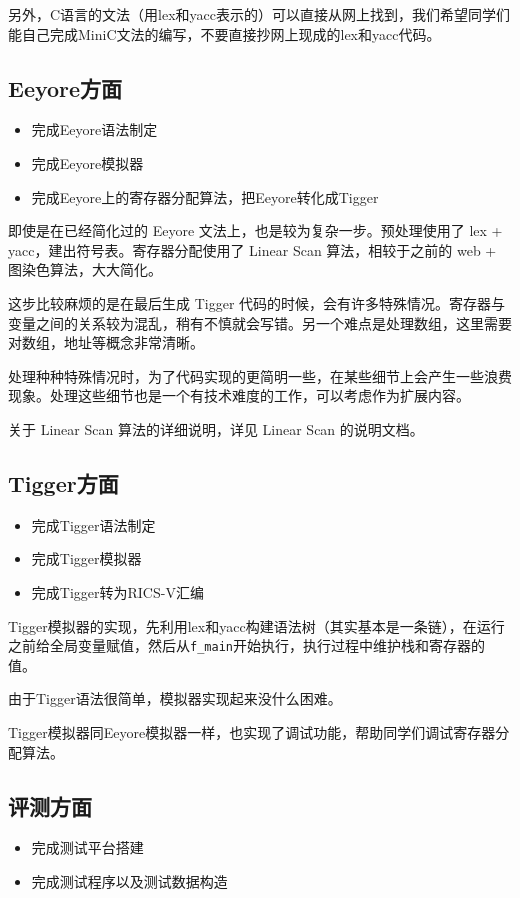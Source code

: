 \documentclass{ctexart}
\begin{document}
另外，C语言的文法（用lex和yacc表示的）可以直接从网上找到，我们希望同学们能自己完成MiniC文法的编写，不要直接抄网上现成的lex和yacc代码。

\subsection{Eeyore方面}

\begin{itemize}
	\item 完成Eeyore语法制定
	\item 完成Eeyore模拟器
	\item 完成Eeyore上的寄存器分配算法，把Eeyore转化成Tigger
\end{itemize}

即使是在已经简化过的 Eeyore 文法上，也是较为复杂一步。预处理使用了 lex + yacc，建出符号表。寄存器分配使用了 Linear Scan 算法，相较于之前的 web + 图染色算法，大大简化。

这步比较麻烦的是在最后生成 Tigger 代码的时候，会有许多特殊情况。寄存器与变量之间的关系较为混乱，稍有不慎就会写错。另一个难点是处理数组，这里需要对数组，地址等概念非常清晰。

处理种种特殊情况时，为了代码实现的更简明一些，在某些细节上会产生一些浪费现象。处理这些细节也是一个有技术难度的工作，可以考虑作为扩展内容。

关于 Linear Scan 算法的详细说明，详见 Linear Scan 的说明文档。

\subsection{Tigger方面}

\begin{itemize}
	\item  完成Tigger语法制定
	\item  完成Tigger模拟器
	\item  完成Tigger转为RICS-V汇编
\end{itemize}

Tigger模拟器的实现，先利用lex和yacc构建语法树（其实基本是一条链），在运行之前给全局变量赋值，然后从\texttt{f\_main}开始执行，执行过程中维护栈和寄存器的值。

由于Tigger语法很简单，模拟器实现起来没什么困难。

Tigger模拟器同Eeyore模拟器一样，也实现了调试功能，帮助同学们调试寄存器分配算法。
\\

\subsection{评测方面}
\begin{itemize}
	\item 完成测试平台搭建
	\item 完成测试程序以及测试数据构造
\end{itemize}
\end{document}
